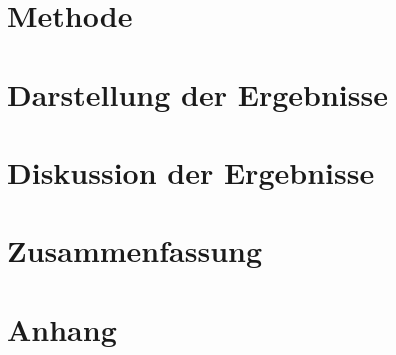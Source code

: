 \section{Methode} %



\newpage


\section{Darstellung der Ergebnisse} %



\newpage


\section{Diskussion der Ergebnisse} %



\newpage


\section{Zusammenfassung} %



\newpage


\section{Anhang} %

